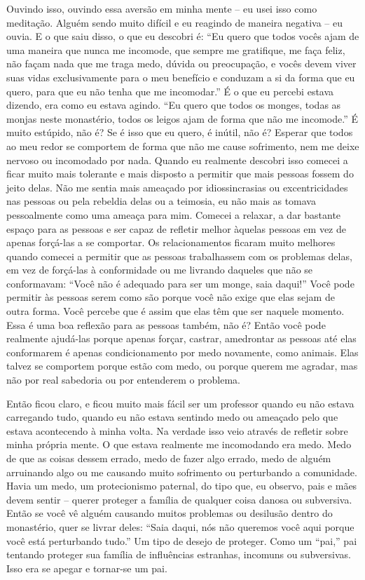 Ouvindo isso, ouvindo essa aversão em minha mente – eu usei isso
como meditação. Alguém sendo muito difícil e eu reagindo de maneira
negativa – eu ouvia. E o que saiu disso, o que eu descobri é: “Eu quero
que todos vocês ajam de uma maneira que nunca me incomode, que sempre
me gratifique, me faça feliz, não façam nada que me traga medo, dúvida
ou preocupação, e vocês devem viver suas vidas exclusivamente para o
meu benefício e conduzam a si da forma que eu quero, para que eu não
tenha que me incomodar.” É o que eu percebi estava dizendo, era como eu
estava agindo. “Eu quero que todos os monges, todas as monjas neste
monastério, todos os leigos ajam de forma que não me incomode.” É muito
estúpido, não é? Se é isso que eu quero, é inútil, não é? Esperar que
todos ao meu redor se comportem de forma que não me cause sofrimento,
nem me deixe nervoso ou incomodado por nada. Quando eu realmente
descobri isso comecei a ficar muito mais tolerante e mais disposto a
permitir que mais pessoas fossem do jeito delas. Não me sentia mais
ameaçado por idiossincrasias ou excentricidades nas pessoas ou pela
rebeldia delas ou a teimosia, eu não mais as tomava pessoalmente como
uma ameaça para mim. Comecei a relaxar, a dar bastante espaço para as
pessoas e ser capaz de refletir melhor àquelas pessoas em vez de apenas
forçá-las a se comportar. Os relacionamentos ficaram muito melhores
quando comecei a permitir que as pessoas trabalhassem com os problemas
delas, em vez de forçá-las à conformidade ou me livrando daqueles que
não se conformavam: “Você não é adequado para ser um monge, saia
daqui!” Você pode permitir às pessoas serem como são porque você não
exige que elas sejam de outra forma. Você percebe que é assim que elas
têm que ser naquele momento. Essa é uma boa reflexão para as pessoas
também, não é? Então você pode realmente ajudá-las porque apenas
forçar, castrar, amedrontar as pessoas até elas conformarem é apenas
condicionamento por medo novamente, como animais. Elas talvez se
comportem porque estão com medo, ou porque querem me agradar, mas não
por real sabedoria ou por entenderem o problema. 

Então ficou claro, e ficou muito mais fácil ser um professor quando
eu não estava carregando tudo, quando eu não estava sentindo medo ou
ameaçado pelo que estava acontecendo à minha volta. Na verdade isso
veio através de refletir sobre minha própria mente. O que estava
realmente me incomodando era medo. Medo de que as coisas dessem errado,
medo de fazer algo errado, medo de alguém arruinando algo ou me
causando muito sofrimento ou perturbando a comunidade. Havia um medo,
um protecionismo paternal, do tipo que, eu observo, pais e mães devem
sentir – querer proteger a família de qualquer coisa danosa ou
subversiva. Então se você vê alguém causando muitos problemas ou
desilusão dentro do monastério, quer se livrar deles: “Saia daqui, nós
não queremos você aqui porque você está perturbando tudo.” Um tipo de
desejo de proteger. Como um “pai,” pai tentando proteger sua família de
influências estranhas, incomuns ou subversivas. Isso era se apegar e
tornar-se um pai. 

